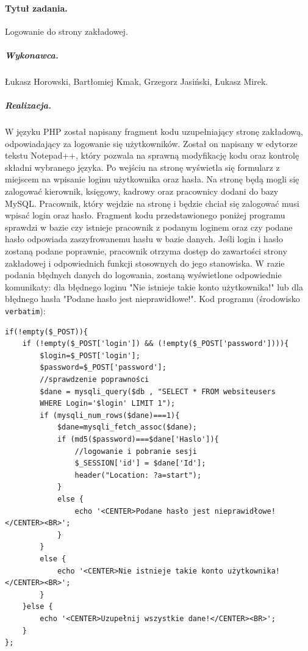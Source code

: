 \documentclass[a4paper]{article}
\begin{document}
\paragraph{Tytuł zadania.} Logowanie do strony zakładowej.
\subparagraph{Wykonawca.} Łukasz Horowski, Bartłomiej Kmak, Grzegorz Jasiński, Łukasz Mirek.
\subparagraph{Realizacja.} W języku PHP został napisany fragment kodu uzupełniający stronę zakładową, odpowiadający za logowanie się użytkowników. Został on napisany w edytorze tekstu Notepad++, który pozwala na sprawną modyfikację kodu oraz kontrolę składni wybranego języka. Po wejściu na stronę wyświetla się formularz z miejscem na wpisanie loginu użytkownika oraz hasła. Na stronę będą mogli się zalogować kierownik, księgowy, kadrowy oraz pracownicy dodani do bazy MySQL. Pracownik, który wejdzie na stronę i będzie chciał się zalogować musi wpisać login oraz hasło. Fragment kodu przedstawionego poniżej programu sprawdzi w bazie czy istnieje pracownik z podanym loginem oraz czy podane hasło odpowiada zaszyfrowanemu hasłu w bazie danych. Jeśli login i hasło zostaną podane poprawnie, pracownik otrzyma dostęp do zawartości strony zakładowej i odpowiednich funkcji stosownych do jego stanowiska. W razie podania błędnych danych do logowania, zostaną wyświetlone odpowiednie komunikaty: dla błędnego loginu "Nie istnieje takie konto użytkownika!" lub dla błędnego hasła "Podane hasło jest nieprawidłowe!". 
Kod programu (środowisko \texttt{verbatim}): 
\begin{verbatim}
if(!empty($_POST)){
	if (!empty($_POST['login']) && (!empty($_POST['password']))){
		$login=$_POST['login'];
		$password=$_POST['password'];
		//sprawdzenie poprawności
		$dane = mysqli_query($db , "SELECT * FROM websiteusers 
		WHERE Login='$login' LIMIT 1");
		if (mysqli_num_rows($dane)===1){
			$dane=mysqli_fetch_assoc($dane);
			if (md5($password)===$dane['Haslo']){
                //logowanie i pobranie sesji
				$_SESSION['id'] = $dane['Id'];
				header("Location: ?a=start");
			}
			else {
				echo '<CENTER>Podane hasło jest nieprawidłowe!</CENTER><BR>';
			}
		}
		else {
			echo '<CENTER>Nie istnieje takie konto użytkownika!</CENTER><BR>';
		}		
	}else {
		echo '<CENTER>Uzupełnij wszystkie dane!</CENTER><BR>';
	}
};
\end{verbatim}
\end{document}
